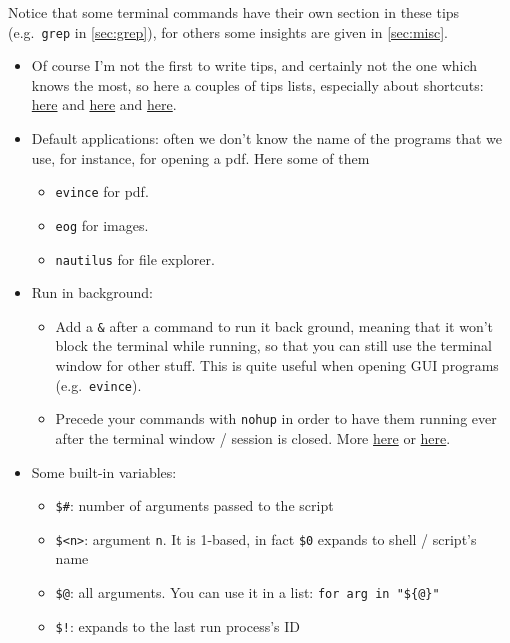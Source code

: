\documentclass[a4paper,12pt,%
              final%
              ]{article}
\begin{document}
Notice that some terminal commands have their own section in these tips (e.g.~\texttt{grep} in \autoref{sec:grep}), for others some insights are given in \autoref{sec:misc}.
\begin{itemize}
  \item Of course I'm not the first to write tips, and certainly not the one which knows the most, so here a couples of tips lists, especially about shortcuts: \href{https://www.techrepublic.com/article/20-terminal-shortcuts-developers-need-to-know/}{here} and \href{https://www.howtogeek.com/howto/ubuntu/keyboard-shortcuts-for-bash-command-shell-for-ubuntu-debian-suse-redhat-linux-etc/}{here} and \href{https://devhints.io/bash}{here}.
  \item Default applications: often we don't know the name of the programs that we use, for instance, for opening a pdf. Here some of them
    \begin{itemize}
      \item \texttt{evince} for pdf.
      \item \texttt{eog} for images.
      \item \texttt{nautilus} for file explorer.
    \end{itemize}
  \item Run in background:
    \begin{itemize}
      \item Add a \verb|&| after a command to run it back ground, meaning that it won't block the terminal while running, so that you can still use the terminal window for other stuff. This is quite useful when opening GUI programs (e.g.~\texttt{evince}).
      \item Precede your commands with \texttt{nohup} in order to have them running ever after the terminal window / session is closed. More \href{https://linux.101hacks.com/unix/nohup-command/}{here} or \href{https://hexadix.com/use-nohup-execute-commands-background-keep-running-exit-shell-promt/}{here}.
    \end{itemize}
  \item Some built-in variables:
    \begin{itemize}
      \item \verb|$#|: number of arguments passed to the script
      \item \verb|$<n>|: argument \texttt{n}. It is 1-based, in fact \verb|$0| expands to shell / script's name
      \item \verb|$@|: all arguments. You can use it in a list: \verb|for arg in "${@}"|
      \item \verb|$!|: expands to the last run process's ID

\end{itemize}
\end{itemize}
\end{document}
